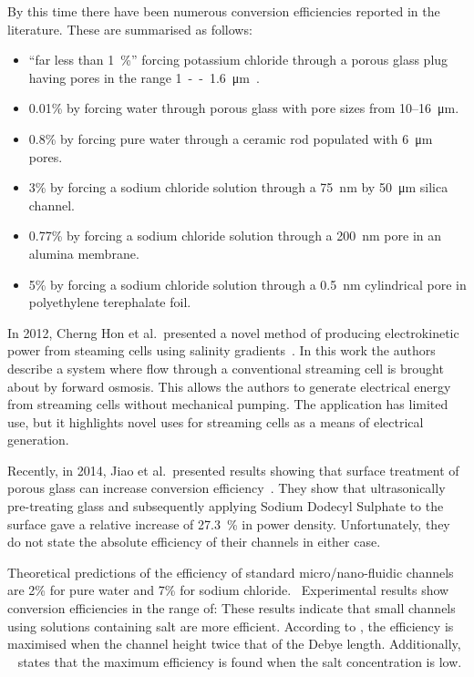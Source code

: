   By this time there have been numerous conversion efficiencies reported in the literature.
  These are summarised as follows:
  \begin{itemize}
    \item ``far less than \SI{1}{\percent}'' forcing potassium chloride through a porous glass plug having pores in the range \SI{1}--\SI{1.6}{\micro\meter}~\cite{Olthuis2005}.
    \item 0.01\% by forcing water through porous glass with pore sizes from 10\thinspace--\SI{16}{\micro\metre}.~\cite{Yang2003}
    \item 0.8\% by forcing pure water through a ceramic rod populated with \SI{6}{\micro\metre} pores.~\cite{Yang2004}
    \item 3\% by forcing a sodium chloride solution through a \SI{75}{\nano\metre} by \SI{50}{\micro\metre} silica channel.~\cite{Heyden2007}
    \item 0.77\% by forcing a sodium chloride solution through a \SI{200}{\nano\metre} pore in an alumina membrane.~\cite{Lu2006}
    \item 5\% by forcing a sodium chloride solution through a \SI{0.5}{\nano\metre} cylindrical pore in polyethylene terephalate foil.~\cite{Xie2008}
  \end{itemize}

  In 2012, Cherng Hon et al.\ presented a novel method of producing electrokinetic power from steaming cells using salinity gradients~\cite{CherngHon2012}.
  In this work the authors describe a system where flow through a conventional streaming cell is brought about by forward osmosis.
  This allows the authors to generate electrical energy from streaming cells without mechanical pumping.
  The application has limited use, but it highlights novel uses for streaming cells as a means of electrical generation.

  Recently, in 2014, Jiao et al.\ presented results showing that surface treatment of porous glass can increase conversion efficiency~\cite{Jiao2014}.
  They show that ultrasonically pre-treating glass and subsequently applying Sodium Dodecyl Sulphate to the surface gave a relative increase of \SI{27.3}{\percent} in power density.
  Unfortunately, they do not state the absolute efficiency of their channels in either case.


  Theoretical predictions of the efficiency of standard micro/nano-fluidic channels are 2\% for pure water and 7\% for sodium chloride.~\cite{VanderHeyden2006}
  Experimental results show conversion efficiencies in the range of:
  These results indicate that small channels using solutions containing salt are more efficient.
  According to \cite{Daiguji2004}, the efficiency is maximised when the channel height twice that of the Debye length.
  Additionally, ~\cite{VanderHeyden2006} states that the maximum efficiency is found when the salt concentration is low.

